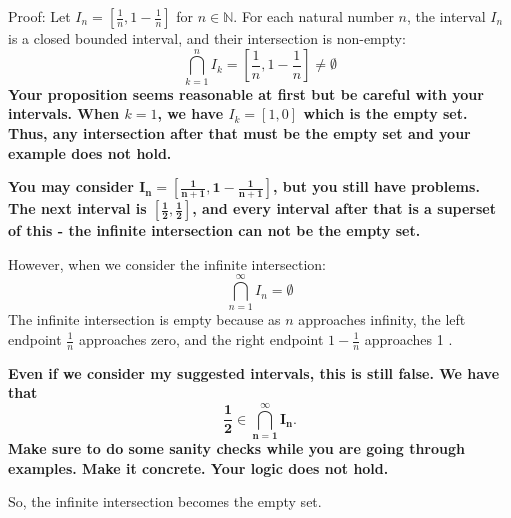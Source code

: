 \documentclass{report}
\begin{document}
Proof: Let $I_n=\left[\frac{1}{n}, 1-\frac{1}{n}\right]$ for $n \in \mathbb{N}$.
For each natural number $n$, the interval $I_n$ is a closed bounded interval, and their intersection is non-empty:
$$
\bigcap_{k=1}^n I_k=\left[\frac{1}{n}, 1-\frac{1}{n}\right] \neq \emptyset
$$
\textbf{
  Your proposition seems reasonable at first but be careful with your intervals. When $k=1$, we have $I_k = \left[1,0 \right]$ which is the empty set. Thus, any intersection after that must be the empty set and your example does not hold.}
  \par
  \textbf{You may consider $\mathbf{I_n=\left[\frac{1}{n+1}, 1-\frac{1}{n+1} \right]}$, but you still have problems. The next interval is $\mathbf{\left[\frac{1}{2}, \frac{1}{2}\right]}$, and every interval after that is a superset of this - the infinite intersection can not be the empty set.
}
\par\bigskip
However, when we consider the infinite intersection:
$$
\bigcap_{n=1}^{\infty} I_n=\emptyset
$$
The infinite intersection is empty because as $n$ approaches infinity, the left endpoint $\frac{1}{n}$ approaches zero, and the right endpoint $1-\frac{1}{n}$ approaches 1 . 

\par
\textbf{
Even if we consider my suggested intervals, this is still false. We have that  $$\mathbf{ \frac{1}{2} \in  \bigcap_{n=1}^{\infty} I_n}.$$ Make sure to do some sanity checks while you are going through examples. Make it concrete. Your logic does not hold. 
}

So, the infinite intersection becomes the empty set.
\end{document}
